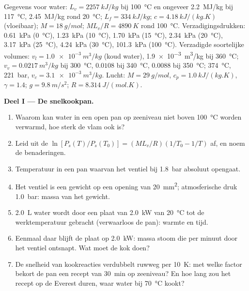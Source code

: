 \begin{problem}
\label{pb:b1:phase-changes:1}
Gegevens voor water: $L_v = \qty{2257}{kJ/kg}$ bij \qty{100}{\degreeCelsius} en
ongeveer \qty{2.2}{MJ/kg} bij \qty{117}{\degreeCelsius}, \qty{2.45}{MJ/kg} rond
\qty{20}{\degreeCelsius}; $L_f = \qty{334}{kJ/kg}$; $c = \qty{4.18}{kJ/(kg.K)}$
(vloeibaar); $M = \qty{18}{g/mol}$; $ML_v/R = \qty{4890}{K}$ rond
\qty{100}{\degreeCelsius}. Verzadigingsdrukken: \qty{0.61}{kPa}
(\qty{0}{\degreeCelsius}), \qty{1.23}{kPa} (\qty{10}{\degreeCelsius}), \qty{1.70}{kPa} (\qty{15}{\degreeCelsius}),
\qty{2.34}{kPa} (\qty{20}{\degreeCelsius}), \qty{3.17}{kPa} (\qty{25}{\degreeCelsius}), \qty{4.24}{kPa}
(\qty{30}{\degreeCelsius}), \qty{101.3}{kPa} (\qty{100}{\degreeCelsius}).
Verzadigde soortelijke volumes: $v_l = \qty{1.0e-3}{m^3/kg}$ (koud water),
\qty{1.9e-3}{m^3/kg} bij \qty{360}{\degreeCelsius}; $v_v = \qty{0.0217}{m^3/kg}$
bij \qty{300}{\degreeCelsius}, $0.0108$ bij \qty{340}{\degreeCelsius}, $0.0088$
bij \qty{350}{\degreeCelsius};  \qty{374}{\degreeCelsius},
\qty{221}{bar}, $v_c = \qty{3.1e-3}{m^3/kg}$. Lucht: $M = \qty{29}{g/mol}$, $c_p =
\qty{1.0}{kJ/(kg.K)}$, $\gamma = 1.4$; $g = \qty{9.8}{m/s^2}$; $R =
\qty{8.314}{J/(mol.K)}$.

\medskip
\noindent\textbf{Deel I --- De snelkookpan.}
\begin{enumerate}
  \item Waarom kan water in een open pan op zeeniveau niet boven
        \qty{100}{\degreeCelsius} worden verwarmd, hoe sterk de vlam ook is?
  \item Leid uit de 
        $\ln[P_s(T)/P_s(T_0)] = (ML_v/R)(1/T_0 - 1/T)$ af, en noem de
        benaderingen.
  \item Temperatuur in een pan waarvan het ventiel bij \qty{1.8}{bar}
        absoluut opengaat.
  \item Het ventiel is een gewicht op een opening van \qty{20}{mm^2};
        atmosferische druk \qty{1.0}{bar}: massa van het gewicht.
  \item \qty{2.0}{L} water wordt door een plaat van \qty{2.0}{kW} van
        \qty{20}{\degreeCelsius} tot de werktemperatuur gebracht (verwaarloos de pan):
        warmte en tijd.
  \item Eenmaal daar blijft de plaat op \qty{2.0}{kW}: massa stoom
        die per minuut door het ventiel ontsnapt. Wat moet de kok doen?
  \item De snelheid van kookreacties verdubbelt ruwweg per \qty{10}{K}:
        met welke factor bekort de pan een recept van \qty{30}{min} op zeeniveau?
        En hoe lang zou het recept op de Everest duren, waar
        water bij \qty{70}{\degreeCelsius} kookt?
\end{enumerate}


\end{problem}
